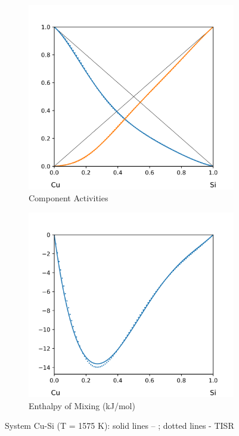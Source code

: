 \documentclass[12pt,abstract]{scrartcl}
\begin{document}
\begin{figure}
\centering
\begin{subfigure}{.5\textwidth}
  \centering
  \includegraphics[width=1\linewidth]{Cu-Si_Activity}
  \caption{Component Activities}
  \label{fig:sub1}
\end{subfigure}%
\begin{subfigure}{.5\textwidth}
  \centering
  \includegraphics[width=1\linewidth]{Cu-Si_Enthalpy} 
  \caption{Enthalpy of Mixing (kJ/mol)}
  \label{fig:sub2}
\end{subfigure}
\caption{System Cu-Si (T = 1575 K): solid lines -- \cite{Al-Si_Data}; dotted lines - TISR}
\label{fig:Cu-Si} 
\end{figure}
\end{document}
